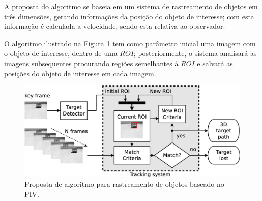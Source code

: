 A proposta do algoritmo se baseia em um sistema de rastreamento de objetos 
em três dimensões, gerando informações
da posição do objeto de interesse; com esta informação é calculada a velocidade,
sendo esta relativa ao observador.

O algoritmo ilustrado na Figura \ref{fig:system} tem como parâmetro inicial uma imagem com o
objeto de interesse, dentro de uma $ROI$; posteriormente, 
o sistema analisará as imagens subsequentes procurando regiões semelhantes à $ROI$
e salvará as posições do objeto de interesse em cada imagem.

\begin{figure}[h]
\includegraphics[width=\columnwidth]{images/figure1-diagram1.eps}
\caption{Proposta de algoritmo para rastreamento de objetos baseado no PIV.}
\label{fig:system}
\end{figure}

